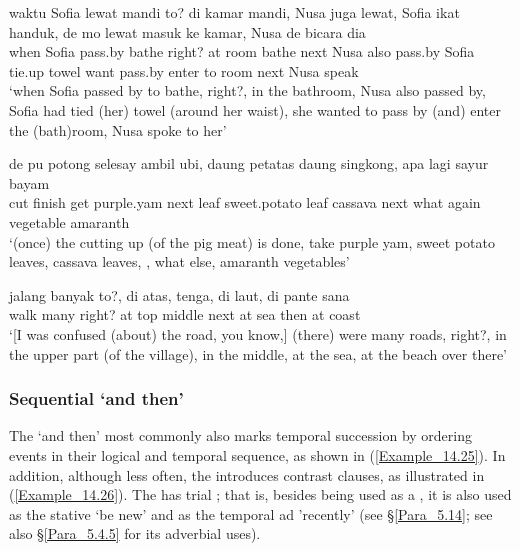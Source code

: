 \ea
	\label{Example_14.22}
	\gll       waktu  Sofia  lewat  mandi  to?  di  kamar  mandi,    Nusa   juga  lewat,  Sofia  ikat  handuk,  de  mo  lewat  masuk  ke   kamar,    Nusa  de  bicara  dia\\    
	when  Sofia  pass.by  bathe  right?  at  room  bathe  next  Nusa   also  pass.by  Sofia  tie.up  towel    want  pass.by  enter  to   room  next  Nusa    speak  \\
	\glt ‘when Sofia passed by to bathe, right?, in the bathroom,  Nusa also passed by, Sofia had tied (her) towel (around her waist), she wanted to pass by (and) enter the (bath)room,  Nusa spoke to her’ \textstyleExampleSource{[081115-001a-Cv.0263]}
\z
	
	
\ea
	\label{Example_14.23}
	\gll       de  pu  potong  selesay  ambil  ubi,    daung  petatas   daung  singkong,    apa  lagi  sayur  bayam\\  
	    cut  finish  get  purple.yam  next  leaf  sweet.potato   leaf  cassava  next  what  again  vegetable  amaranth\\
	\glt [A recipe:] ‘(once) the cutting up (of the pig meat) is done, take purple yam,  sweet potato leaves, cassava leaves, , what else, amaranth vegetables’ \textstyleExampleSource{[081014-017-CvPr.0033]}
\z
	
\ea
	\label{Example_14.24}
	\gll       {\ldots}  jalang  banyak  to?,  di  atas,  tenga,    di  laut,   di  pante  sana\\  
	\textstyleChSmallCaps{}  walk  many  right?  at  top  middle  next  at  sea   then  at  coast  \\
	\glt ‘[I was confused (about) the road, you know,] (there) were many roads, right?, in the upper part (of the village), in the middle,  at the sea,  at the beach over there’ \textstyleExampleSource{[081025-008-Cv.0018]}
\z

\subsubsection[Sequential baru ‘and then’]{Sequential  ‘and then’}
\label{Para_14.2.3.2}
The    ‘and then’ most commonly also marks temporal succession by ordering events in their logical and temporal sequence, as shown in (\ref{Example_14.25}). In addition, although less often, the  introduces contrast clauses, as illustrated in (\ref{Example_14.26}). The  has trial ; that is, besides being used as a , it is also used as the stative   ‘be new’ and as the temporal ad  'recently' (see §\ref{Para_5.14}; see also §\ref{Para_5.4.5} for its adverbial uses).

